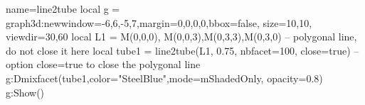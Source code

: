 \documentclass[border=5pt]{standalone}%
\begin{document}
\begin{luadraw}{name=line2tube}
  local g = graph3d:new{window={-6,6,-5,7},margin={0,0,0,0},bbox=false, size={10,10}, viewdir={30,60}}
  local L1 = {M(0,0,0), M(0,0,3),M(0,3,3),M(0,3,0)} -- polygonal line, do not close it here
  local tube1 = line2tube(L1, 0.75, {nbfacet=100, close=true}) -- option close=true to close the polygonal line
  g:Dmixfacet(tube1,{color="SteelBlue",mode=mShadedOnly, opacity=0.8})
  g:Show()
\end{luadraw}
\end{document}
